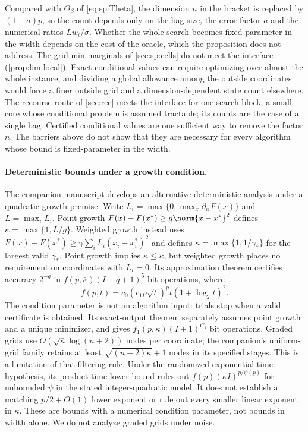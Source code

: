 Compared with $\Theta_\beta$ of \eqref{eq:sp:Theta}, the dimension $n$ in
the bracket is replaced by $(1+a)p$, so the count depends only on the bag
size, the error factor $a$ and the numerical ratios $Lw_i/\sigma$. Whether the whole search
becomes fixed-parameter in the width depends on the cost of the oracle,
which the proposition does not address. The grid min-marginals of
\cref{sec:sp:cells} do not meet the interface (\cref{prop:lim:local}).
Exact conditional values can require optimizing over almost the whole
instance, and dividing a global allowance among the outside coordinates
would force a finer outside grid and a dimension-dependent state count
elsewhere. The recourse route of \cref{sec:rec} meets the interface for one
search block, a small core whose conditional problem is assumed tractable;
its counts are the case of a single bag. Certified conditional values are
one sufficient way to remove the factor $n$. The barriers above do not show
that they are necessary for every algorithm whose bound is fixed-parameter
in the width.

\paragraph{Deterministic bounds under a growth condition.}
The companion manuscript \citep{companion-decomposition-aware} develops
an alternative deterministic analysis under a quadratic-growth premise.
Write $L_i=\max\{0,\max_x\partial_{ii}F(x)\}$ and $L=\max_iL_i$.
Point growth $F(x)-F(x^*)\ge g\norm{x-x^*}^2$ defines
$\kappa=\max\{1,L/g\}$. Weighted growth instead uses
$F(x)-F(x^*)\ge\gamma\sum_iL_i(x_i-x_i^*)^2$ and defines
$\bar\kappa=\max\{1,1/\gamma_*\}$ for the largest valid $\gamma_*$.
Point growth implies $\bar\kappa\le\kappa$, but weighted growth places
no requirement on coordinates with $L_i=0$.
Its approximation theorem certifies accuracy $2^{-q}$ in
$f(p,\bar\kappa)(I+q+1)^5$ bit operations, where
\[
 f(p,t)=c_0(c_1p\sqrt{t})^p t(1+\log_2t)^2.
\]
The condition parameter is not an algorithm input: trials stop when a
valid certificate is obtained. Its exact-output theorem separately assumes
point growth and a unique minimizer, and gives
$f_1(p,\kappa)(I+1)^{C_1}$ bit operations. Graded grids use
$O(\sqrt{\bar\kappa}\log(n+2))$ nodes per coordinate; the companion's
uniform-grid family retains at least $\sqrt{(n-2)\kappa}+1$ nodes in its
specified stages. This is a limitation of that filtering rule.
Under the randomized exponential-time hypothesis, its product-time lower
bound rules out $f(p)(\kappa I)^{p/\psi(p)}$ for unbounded $\psi$ in the
stated integer-quadratic model. It does not establish a matching
$p/2+O(1)$ lower exponent or rule out every smaller linear exponent in
$\kappa$. These are bounds with a numerical condition parameter, not
bounds in width alone. We do not analyze graded grids under noise.

